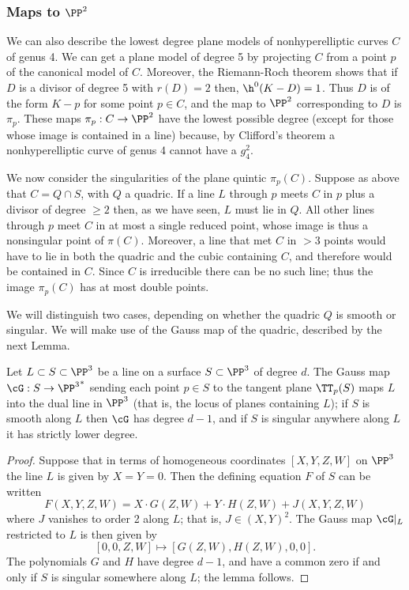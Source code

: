 \subsubsection{Maps to $\PP^2$}

We can also describe the lowest degree plane models of nonhyperelliptic curves $C$ of genus 4. 
We can get a plane model of degree 5 by projecting $C$ from a point $p$ of the canonical model of $C$.
Moreover, the Riemann-Roch theorem shows that if $D$ is a divisor of degree 5 with $r(D)=2$ then,  $\h^0(K-D) = 1$. Thus $D$ is of the form $K-p$ for some point $p \in C$, and the map to $\PP^2$ corresponding to $D$ is $\pi_p$. These  maps $\pi_p: C\to \PP^2$ have the lowest possible degree (except for those whose image is  contained in a line) because, by Clifford's theorem a nonhyperelliptic curve of genus 4 cannot have a $g^2_4$.

We now consider the singularities of the plane quintic $\pi_p(C)$. Suppose as above that $C = Q\cap S$, with $Q$ a quadric. If a line $L$ through $p$ meets $C$ in $p$ plus a divisor of degree $\geq 2$ then, as we have seen, $L$ must lie in $Q$.  All other lines through $p$ meet $C$ in at most a single reduced point,  whose image is thus a nonsingular point of $\pi(C)$. Moreover, a line that met $C$ in $>3$ points would have to lie in both the quadric and the cubic containing $C$, and therefore would be contained in $C$. Since $C$ is irreducible there can be no such line; thus the image $\pi_p(C)$ has at most double points.

We will distinguish two cases, depending on whether the quadric $Q$ is smooth or singular. We will make use of the Gauss map of the quadric, described by the next Lemma.

\begin{lemma}
Let $L \subset S \subset \PP^3$ be a line on a surface $S \subset \PP^3$ of degree $d$. The Gauss map $\cG : S \to {\PP^3}^*$ sending each point $p \in S$ to the tangent plane $\TT_p(S)$ maps $L$ into the dual line in $\PP^3$ (that is, the locus of planes containing $L$); if $S$ is smooth along $L$ then $\cG$  has degree $d-1$, and if $S$ is singular anywhere along $L$ it has strictly lower degree.
\end{lemma}

\begin{proof}
Suppose that in terms of homogeneous coordinates $[X,Y,Z,W]$ on $\PP^3$ the line $L$ is given by $X = Y = 0$. Then the defining equation $F$ of $S$ can be written
$$
F(X,Y,Z,W) = X\cdot G(Z,W) + Y\cdot H(Z,W) + J(X,Y,Z,W)
$$
where $J$ vanishes to order 2 along $L$; that is, $J \in (X,Y)^2$. The Gauss map $\cG|_L$ restricted to $L$ is then given by
$$
[0,0,Z,W] \mapsto [G(Z,W), H(Z,W), 0, 0].
$$
The polynomials $G$ and $H$ have degree $d-1$, and have a common zero if and only if $S$ is singular somewhere along $L$; the lemma follows.
\end{proof}

